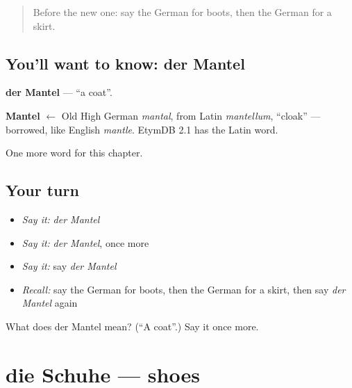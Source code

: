 \label{lesson:GE-C119-mantel}



\begin{quote}
Before the new one: say the German for boots, then the German for a skirt.
\end{quote}

\subsection*{You'll want to know: der Mantel}
\textbf{der Mantel} — \textquotedblleft{}a coat\textquotedblright{}.

\begin{cousinweb}
\textbf{Mantel} $\leftarrow$ Old High German \emph{mantal}, from Latin \emph{mantellum}, \textquotedblleft{}cloak\textquotedblright{} — borrowed, like English \emph{mantle}. EtymDB 2.1 has the Latin word.
\end{cousinweb}

\begin{grammarlens}[title={What you've built}]
One more word for this chapter.
\end{grammarlens}

\subsection*{Your turn}
\begin{itemize}
\raggedright
  \item \emph{Say it:} \emph{der Mantel}
  \item \emph{Say it:} \emph{der Mantel}, once more
  \item \emph{Say it:} say \emph{der Mantel}
  \item \emph{Recall:} say the German for boots, then the German for a skirt, then say \emph{der Mantel} again
\end{itemize}

\begin{tcolorbox}[breakable,colback=teal!4,colframe=teal!35!black,title={Before you move on}]
What does der Mantel mean? (\textquotedblleft{}A coat\textquotedblright{}.) Say it once more.
\end{tcolorbox}
\section[die Schuhe]{die Schuhe — shoes}

\label{lesson:GE-C119-schuhe}



